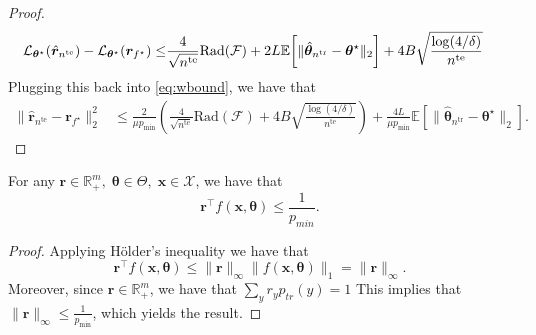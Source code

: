 \begin{proof}
    \begin{equation}
    \begin{aligned}
    \mathcal{L}_{\boldsymbol{\theta}^\star}(\hat{\boldsymbol{r}}_{{n}^{\text{te}}}) - \mathcal{L}_{\boldsymbol{\theta}^\star}(\boldsymbol{r}_{f^\star}) \leq 
    &\frac{4}{\sqrt{{n}^{\text{te}}}} \text{Rad}(\mathcal{F}) +2L \mathbb{E}\bigg[\|\hat{\boldsymbol{\theta}}_{{n}^{\text{tr}}} - \boldsymbol{\theta}^\star\|_2 \bigg] + 4B\sqrt{\frac{\log(4/\delta)}{{n}^{\text{te}}}}
    \end{aligned}
    \end{equation}
    Plugging this back into \cref{eq:wbound}, we have that
    \begin{equation}
    \begin{aligned}
    \|\hat{\boldsymbol{r}}_{{n}^{\text{te}}} - \boldsymbol{r}_{f^\star}\|_2^2 &\leq \frac{2}{\mu p_{\min}}\left( \frac{4}{\sqrt{{n}^{\text{te}}}} \text{Rad}(\mathcal{F}) + 4B\sqrt{\frac{\log(4/\delta)}{{n}^{\text{te}}}} \right) + \frac{4L}{\mu p_{\min}} \mathbb{E}\left[\|\hat{\boldsymbol{\theta}}_{{n}^{\text{tr}}} - \boldsymbol{\theta}^\star\|_2\right].
    \end{aligned}
    \end{equation}
\end{proof}

\begin{lemma}
    \label{lem:upperbound}
    For any $\boldsymbol{r} \in \mathbb{R}_{+}^m,\; \boldsymbol{\theta} \in \Theta,\; \boldsymbol{x} \in \mathcal{X}$, we have that
    \[
    \boldsymbol{r}^\top  f(\boldsymbol{x}, \boldsymbol{\theta}) \leq \frac{1}{p_{min}}.
    \]
\end{lemma}
\begin{proof}
    Applying H\"{o}lder's inequality we have that
    \[
    \boldsymbol{r}^\top  f(\boldsymbol{x}, \boldsymbol{\theta}) \leq  \|\boldsymbol{r}\|_{\infty} \|f(\boldsymbol{x}, \boldsymbol{\theta})\|_1 = \|\boldsymbol{r}\|_{\infty}.
    \]
    Moreover, since $\boldsymbol{r} \in \mathbb{R}_{+}^m$, we have that
    \(
    \sum_y r_y p_{tr}(y) = 1
    \)
    This implies that $\|\boldsymbol{r}\|_{\infty} \leq \frac{1}{p_{\min}}$, which yields the result.
\end{proof}



